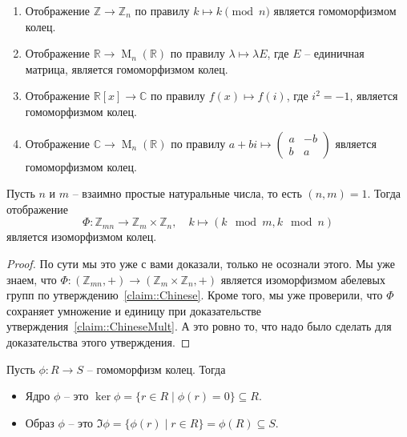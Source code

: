 \begin{examples}
\begin{enumerate}
\item Отображение  $\mathbb Z\to \mathbb Z_n$ по правилу $k\mapsto k \pmod n$ является гомоморфизмом колец.

\item Отображение $\mathbb R\to \operatorname{M}_n(\mathbb R)$ по правилу $\lambda \mapsto \lambda E$, где $E$ -- единичная матрица, является гомоморфизмом колец.

\item Отображение $\mathbb R[x]\to \mathbb C$ по правилу $f(x) \mapsto f(i)$, где $i^2 = -1$, является гомоморфизмом колец.

\item Отображение $\mathbb C\to \operatorname{M}_n(\mathbb R)$ по правилу $a + bi \mapsto \left(\begin{smallmatrix}{a}&{-b}\\{b}&{a}\end{smallmatrix}\right)$ является гомоморфизмом колец.
\end{enumerate}
\end{examples}


\begin{claim}
Пусть $n$ и $m$ -- взаимно простые натуральные числа, то есть $(n,m) = 1$.
Тогда отображение
\[
\Phi \colon \mathbb Z_{mn} \to \mathbb Z_m \times \mathbb Z_n,\quad k\mapsto (k\!\!\mod m, k\!\!\mod n)
\]
является изоморфизмом колец.
\end{claim}
\begin{proof}
По сути мы это уже с вами доказали, только не осознали этого.
Мы уже знаем, что $\Phi\colon (\mathbb Z_{mn}, +) \to (\mathbb Z_m\times\mathbb Z_n, +)$ является изоморфизмом абелевых групп по утверждению~\ref{claim::Chinese}.
Кроме того, мы уже проверили, что $\Phi$ сохраняет умножение и единицу при доказательстве утверждения~\ref{claim::ChineseMult}.
А это ровно то, что надо было сделать для доказательства этого утверждения.
\end{proof}

\begin{definition}
Пусть $\phi\colon R\to S$ -- гомоморфизм колец.
Тогда
\begin{itemize}
\item Ядро $\phi$ -- это $\ker\phi = \{r\in R\mid \phi(r) = 0\}\subseteq R$.

\item Образ $\phi$ -- это $\Im \phi = \{\phi(r) \mid r\in R\} = \phi(R)\subseteq S$.
\end{itemize}
\end{definition}

